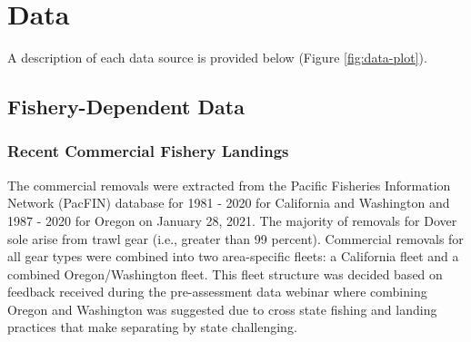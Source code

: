 \documentclass[11pt,
  english,
  a4paper,
]{article}
\begin{document}
\leavevmode\tagmcend\tagstructend\par


\hypertarget{data}{%
\section{Data}\label{data}}

\leavevmode\tagmcend\tagstructend


A description of each data source is provided below (Figure \ref{fig:data-plot}).

\leavevmode\tagmcend\tagstructend\par


\hypertarget{fishery-dependent-data}{%
\subsection{Fishery-Dependent Data}\label{fishery-dependent-data}}

\leavevmode\tagmcend\tagstructend


\hypertarget{recent-commercial-fishery-landings}{%
\subsubsection{Recent Commercial Fishery Landings}\label{recent-commercial-fishery-landings}}

\leavevmode\tagmcend\tagstructend


The commercial removals were extracted from the Pacific Fisheries Information Network (PacFIN) database for 1981 - 2020 for California and Washington and 1987 - 2020 for Oregon on January 28, 2021. The majority of removals for Dover sole arise from trawl gear (i.e., greater than 99 percent). Commercial removals for all gear types were combined into two area-specific fleets: a California fleet and a combined Oregon/Washington fleet. This fleet structure was decided based on feedback received during the pre-assessment data webinar where combining Oregon and Washington was suggested due to cross state fishing and landing practices that make separating by state challenging.
\end{document}

